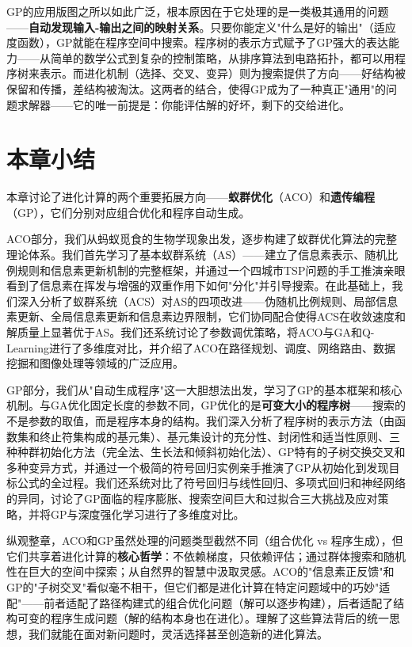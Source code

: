 \documentclass[lang=cn,zihao=-4,a4paper,fontset=windows]{beautybook}
\begin{document}
\begin{fancybox}
GP的应用版图之所以如此广泛，根本原因在于它处理的是一类极其通用的问题——\textbf{自动发现输入-输出之间的映射关系}。只要你能定义"什么是好的输出"（适应度函数），GP就能在程序空间中搜索。程序树的表示方式赋予了GP强大的表达能力——从简单的数学公式到复杂的控制策略，从排序算法到电路拓扑，都可以用程序树来表示。而进化机制（选择、交叉、变异）则为搜索提供了方向——好结构被保留和传播，差结构被淘汰。这两者的结合，使得GP成为了一种真正"通用"的问题求解器——它的唯一前提是：你能评估解的好坏，剩下的交给进化。
\end{fancybox}

\section*{本章小结}

本章讨论了进化计算的两个重要拓展方向——\textbf{蚁群优化}（ACO）和\textbf{遗传编程}（GP），它们分别对应组合优化和程序自动生成。

ACO部分，我们从蚂蚁觅食的生物学现象出发，逐步构建了蚁群优化算法的完整理论体系。我们首先学习了基本蚁群系统（AS）——建立了信息素表示、随机比例规则和信息素更新机制的完整框架，并通过一个四城市TSP问题的手工推演亲眼看到了信息素在挥发与增强的双重作用下如何"分化"并引导搜索。在此基础上，我们深入分析了蚁群系统（ACS）对AS的四项改进——伪随机比例规则、局部信息素更新、全局信息素更新和信息素边界限制，它们协同配合使得ACS在收敛速度和解质量上显著优于AS。我们还系统讨论了参数调优策略，将ACO与GA和Q-Learning进行了多维度对比，并介绍了ACO在路径规划、调度、网络路由、数据挖掘和图像处理等领域的广泛应用。

GP部分，我们从"自动生成程序"这一大胆想法出发，学习了GP的基本框架和核心机制。与GA优化固定长度的参数不同，GP优化的是\textbf{可变大小的程序树}——搜索的不是参数的取值，而是程序本身的结构。我们深入分析了程序树的表示方法（由函数集和终止符集构成的基元集）、基元集设计的充分性、封闭性和适当性原则、三种种群初始化方法（完全法、生长法和倾斜初始化法）、GP特有的子树交换交叉和多种变异方式，并通过一个极简的符号回归实例亲手推演了GP从初始化到发现目标公式的全过程。我们还系统对比了符号回归与线性回归、多项式回归和神经网络的异同，讨论了GP面临的程序膨胀、搜索空间巨大和过拟合三大挑战及应对策略，并将GP与深度强化学习进行了多维度对比。

纵观整章，ACO和GP虽然处理的问题类型截然不同（组合优化 vs 程序生成），但它们共享着进化计算的\textbf{核心哲学}：不依赖梯度，只依赖评估；通过群体搜索和随机性在巨大的空间中探索；从自然界的智慧中汲取灵感。ACO的"信息素正反馈"和GP的"子树交叉"看似毫不相干，但它们都是进化计算在特定问题域中的巧妙"适配"——前者适配了路径构建式的组合优化问题（解可以逐步构建），后者适配了结构可变的程序生成问题（解的结构本身也在进化）。理解了这些算法背后的统一思想，我们就能在面对新问题时，灵活选择甚至创造新的进化算法。
\end{document}
